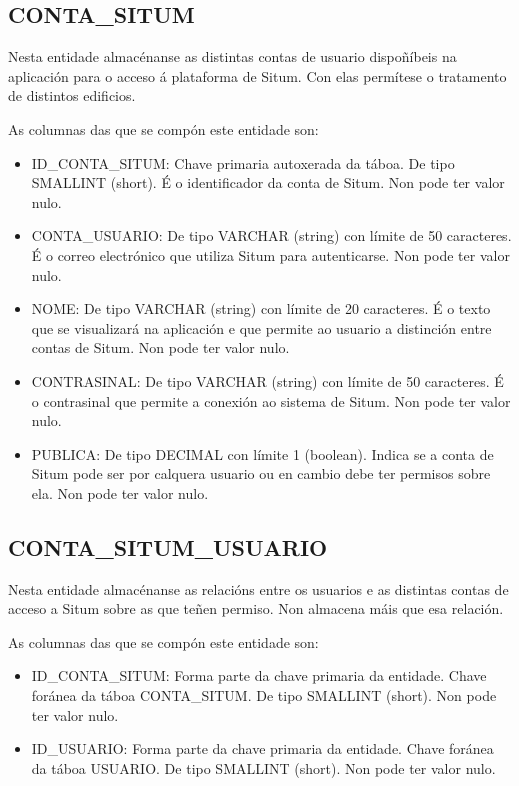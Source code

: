 \subsection{CONTA\_SITUM}
Nesta entidade almacénanse as distintas contas de usuario dispoñíbeis na aplicación para o acceso á plataforma de Situm. Con elas permítese o tratamento de distintos edificios.

As columnas das que se compón este entidade son:
\begin{itemize}
	\item ID\_CONTA\_SITUM: Chave primaria autoxerada da táboa. De tipo SMALLINT (short). É o identificador da conta de Situm. Non pode ter valor nulo.
	\item CONTA\_USUARIO: De tipo VARCHAR (string) con límite de 50 caracteres. É o correo electrónico que utiliza Situm para autenticarse. Non pode ter valor nulo.
	\item NOME: De tipo VARCHAR (string) con límite de 20 caracteres. É o texto que se visualizará na aplicación e que permite ao usuario a distinción entre contas de Situm. Non pode ter valor nulo.
	\item CONTRASINAL: De tipo VARCHAR (string) con límite de 50 caracteres. É o contrasinal que permite a conexión ao sistema de Situm. Non pode ter valor nulo.
	\item PUBLICA: De tipo DECIMAL con límite 1 (boolean). Indica se a conta de Situm pode ser por calquera usuario ou en cambio debe ter permisos sobre ela. Non pode ter valor nulo.
\end{itemize}


\subsection{CONTA\_SITUM\_USUARIO}
Nesta entidade almacénanse as relacións entre os usuarios e as distintas contas de acceso a Situm sobre as que teñen permiso. Non almacena máis que esa relación.

As columnas das que se compón este entidade son:
\begin{itemize}
	\item ID\_CONTA\_SITUM: Forma parte da chave primaria da entidade. Chave foránea da táboa CONTA\_SITUM. De tipo SMALLINT (short). Non pode ter valor nulo.
	\item ID\_USUARIO: Forma parte da chave primaria da entidade. Chave foránea da táboa USUARIO. De tipo SMALLINT (short). Non pode ter valor nulo.
\end{itemize}


